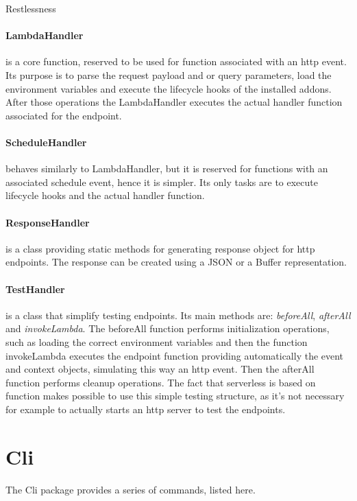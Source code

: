 \begin{chapter}{Restlessness}
    \paragraph{LambdaHandler} is a core function, reserved to be used for function
    associated with an http event. Its purpose is to parse the request payload and
    or query parameters, load the environment variables and execute the lifecycle
    hooks of the installed addons. After those operations the LambdaHandler executes
    the actual handler function associated for the endpoint.

    \paragraph{ScheduleHandler} behaves similarly to LambdaHandler, but it is
    reserved for functions with an associated schedule event, hence it is simpler.
    Its only tasks are to execute lifecycle hooks and the actual handler function.

    \paragraph{ResponseHandler} is a class providing static methods for generating
    response object for http endpoints. The response can be created using a JSON
    or a Buffer representation.

    \paragraph{TestHandler} is a class that simplify testing endpoints. Its main
    methods are: \textit{beforeAll}, \textit{afterAll} and \textit{invokeLambda}.
    The beforeAll function performs initialization operations, such as loading the
    correct environment variables and then the function invokeLambda executes the
    endpoint function providing automatically the event and context objects,
    simulating this way an http event. Then the afterAll function performs cleanup
    operations.
    The fact that serverless is based on function makes possible to use this simple
    testing structure, as it's not necessary for example to actually starts an http
    server to test the endpoints.

    \section{Cli}
    The Cli package provides a series of commands, listed here.


\end{chapter}
